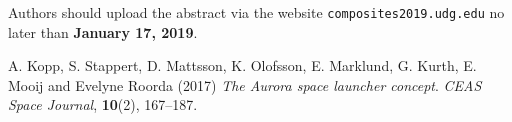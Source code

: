 \documentclass[12pt,a4paper]{article}
\begin{document}
Authors should upload the abstract via the website \texttt{composites2019.udg.edu} no later than \textbf{January 17, 2019}. 

\begin{thebibliography}{9}
%
%
 A. Kopp, S. Stappert, D. Mattsson, K. Olofsson, E. Marklund, G. Kurth, E. Mooij and Evelyne Roorda (2017) \textit{The Aurora space launcher concept}. \textit{CEAS Space Journal}, \textbf{10}(2), 167--187.
%
\end{thebibliography}
\end{document}
